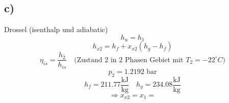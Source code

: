 

\subsection*{c)}
Drossel (isenthalp und adiabatic) \\
\[
h_u = h_1
\]
\[
h_{x2} = h_f + x_{x2} (h_g - h_f)
\]
\[
\eta_{is} = \frac{h_2}{h_{is}} \quad \text{(Zustand 2 in 2 Phasen Gebiet mit } T_2 = -22^\circ C)
\]
\[
p_2 = 1.2192 \text{ bar}
\]
\[
h_f = 211.77 \frac{\text{kJ}}{\text{kg}} \quad h_g = 234.08 \frac{\text{kJ}}{\text{kg}}
\]
\[
\Rightarrow x_{x2} = x_1 =
\]
